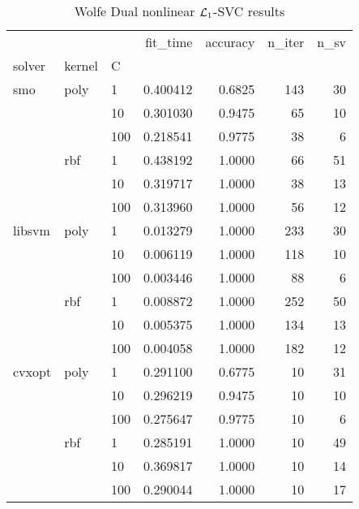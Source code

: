 \begin{table}[H]
\centering
\caption{Wolfe Dual nonlinear $\protect \mathcal{L}_1$-SVC results}
\label{nonlinear_dual_l1_svc_cv_results}
\begin{tabular}{lllrrrr}
\toprule
       &     &     &  fit\_time &  accuracy &  n\_iter &  n\_sv \\
solver & kernel & C &           &           &         &       \\
\midrule
smo & poly & 1   &  0.400412 &    0.6825 &     143 &    30 \\
       &     & 10  &  0.301030 &    0.9475 &      65 &    10 \\
       &     & 100 &  0.218541 &    0.9775 &      38 &     6 \\
       & rbf & 1   &  0.438192 &    1.0000 &      66 &    51 \\
       &     & 10  &  0.319717 &    1.0000 &      38 &    13 \\
       &     & 100 &  0.313960 &    1.0000 &      56 &    12 \\
libsvm & poly & 1   &  0.013279 &    1.0000 &     233 &    30 \\
       &     & 10  &  0.006119 &    1.0000 &     118 &    10 \\
       &     & 100 &  0.003446 &    1.0000 &      88 &     6 \\
       & rbf & 1   &  0.008872 &    1.0000 &     252 &    50 \\
       &     & 10  &  0.005375 &    1.0000 &     134 &    13 \\
       &     & 100 &  0.004058 &    1.0000 &     182 &    12 \\
cvxopt & poly & 1   &  0.291100 &    0.6775 &      10 &    31 \\
       &     & 10  &  0.296219 &    0.9475 &      10 &    10 \\
       &     & 100 &  0.275647 &    0.9775 &      10 &     6 \\
       & rbf & 1   &  0.285191 &    1.0000 &      10 &    49 \\
       &     & 10  &  0.369817 &    1.0000 &      10 &    14 \\
       &     & 100 &  0.290044 &    1.0000 &      10 &    17 \\
\bottomrule
\end{tabular}
\end{table}
